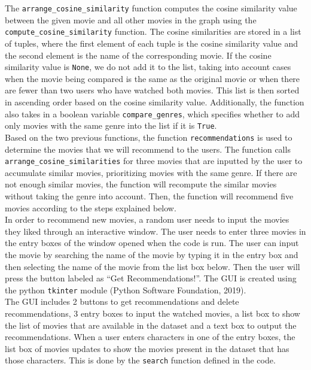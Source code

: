 \documentclass[fontsize=11pt]{article}
\begin{document}
\quad The \texttt{arrange\_cosine\_similarity} function computes the cosine similarity value between the given movie and all other movies in the graph using the \texttt{compute\_cosine\_similarity} function. The cosine similarities are stored in a list of tuples, where the first element of each tuple is the cosine similarity value and the second element is the name of the corresponding movie. If the cosine similarity value is \texttt{None}, we do not add it to the list, taking into account cases when the movie being compared is the same as the original movie or when there are fewer than two users who have watched both movies. This list is then sorted in ascending order based on the cosine similarity value. Additionally, the function also takes in a boolean variable \texttt{compare\_genres}, which specifies whether to add only movies with the same genre into the list if it is \texttt{True}.\\

\quad Based on the two previous functions, the function \texttt{recommendations} is used to determine the movies that we will recommend to the users. The function calls \texttt{arrange\_cosine\_similarities} for three movies that are inputted by the user to accumulate similar movies, prioritizing movies with the same genre. If there are not enough similar movies, the function will recompute the similar movies without taking the genre into account. Then, the function will recommend five movies according to the steps explained below.\\

\quad In order to recommend new movies, a random user needs to input the movies they liked through an interactive window. The user needs to enter three movies in the entry boxes of the window opened when the code is run. The user can input the movie by searching the name of the movie by typing it in the entry box and then selecting the name of the movie from the list box below. Then the user will press the button labeled as “Get Recommendations!”.
The GUI is created using the python \texttt{tkinter} module (Python Software Foundation, 2019). \\
    
\quad The GUI includes 2 buttons to get recommendations and delete recommendations, 3 entry boxes to input the watched movies, a list box to show the list of movies that are available in the dataset and a text box to output the recommendations. When a user enters characters in one of the entry boxes, the list box of movies updates to show the movies present in the dataset that has those characters. This is done by the \texttt{search} function defined in the code. \\
\end{document}
